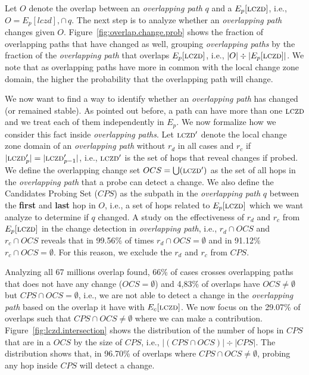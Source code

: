 Let $O$ denote the overlap between an \emph{overlapping path} $q$ and a 
$E_p[\mathrm{\textsc{lczd}}]$, i.e., $O = E_p[lczd],\cap\,q$. The next step 
is to analyze whether an \emph{overlapping path} changes given $O$.
Figure~\ref{fig:overlap.change.prob} shows
the fraction of overlapping paths that have changed as well, grouping
\emph{overlapping paths} by the fraction of the \emph{overlapping path}
that overlaps $E_p[\mathrm{\textsc{lczd}}]$, i.e.,
$|O|\div|E_p[\mathrm{\textsc{lczd}}]|$.  We note that as overlapping paths
have more in common with the local change zone domain, the higher
the probability that the overlapping path will change. 

We now want to find a way to identify whether an \emph{overlapping path}
has changed (or remained stable). As pointed out before, a path can have more
than one $\mathrm{\textsc{lczd}}$ and we treat each of them independently in $E_p$.
We now formalize how we consider this fact inside \emph{overlapping paths}.
Let $\mathrm{\textsc{lczd}}'$ denote the local change zone domain of an \emph{overlapping path}
without $r_d$ in all cases and $r_c$ if $|\mathrm{\textsc{lczd}}'_{p}| = |\mathrm{\textsc{lczd}}'_{p-1}|$, i.e.,
$\mathrm{\textsc{lczd}}'$ is the set of hops that reveal changes if probed. We define the
overlapping change set $OCS = \bigcup(\mathrm{\textsc{lczd}}')$ as the set of all hops in the
\emph{overlapping path} that a probe can detect a change.
We also define the Candidates Probing Set ($CPS$) as the subpath 
in the \emph{overlapping path} $q$ between the \textbf{first} and \textbf{last} 
hop in $O$, i.e., a set of hops related to $E_p[\mathrm{\textsc{lczd}}]$ which we want analyze
to determine if $q$ changed. A study on the effectiveness of $r_d$ and $r_c$ 
from $E_p[\mathrm{\textsc{lczd}}]$ in the change detection in \emph{overlapping path}, i.e.,
$r_d \cap OCS$ and $r_c \cap OCS$ reveals that in 99.56\% of times 
$r_d \cap OCS = \emptyset$ and in 91.12\% $r_c \cap OCS = \emptyset$.
For this reason, we exclude the $r_d$ and $r_c$ from $CPS$.

Analyzing all 67 millions overlap found, 66\% of cases crosses overlapping paths 
that does not have any change ($OCS = \emptyset$) and 4,83\% of overlaps have 
$OCS \ne \emptyset$ but $CPS \cap OCS = \emptyset$, 
i.e., we are not able to detect a change in the \emph{overlapping path}
based on the overlap it have with $E_c[\mathrm{\textsc{lczd}}]$. 
We now focus on the 29.07\% of overlaps such that $CPS \cap OCS \ne \emptyset$
where we can make a contribution. Figure~\ref{fig:lczd.intersection}  
shows the distribution of the number of hops in $CPS$ that are in a $OCS$ by the size of $CPS$,
i.e., $|(CPS \cap OCS)| \div |CPS|$.  The distribution shows that,
in 96.70\% of overlaps where $CPS \cap OCS \ne \emptyset$, probing any hop inside $CPS$ 
will detect a change.

